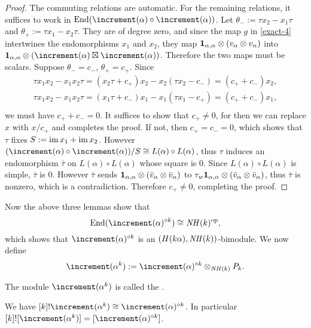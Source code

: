 \begin{proof}
    The commuting relations are automatic. For the remaining relations,
    it suffices to work in $\End(\std(\alpha)\circ\std(\alpha))$.
    Let $\theta_- := \tau x_2-x_1\tau$ and $\theta_+ := \tau x_1-x_2\tau$.
    They are of degree zero, and since the map $g$ 
    in \ref{exact-4} intertwines the endomorphisms
    $x_1$ and $x_2$, they map $\mathbf{1}_{\alpha,\alpha}\otimes(v_\alpha\otimes v_\alpha)$
    into $\1_{\alpha,\alpha}\ox(\std(\alpha)\ex\std(\alpha))$.
    Therefore the two maps must be scalars. Suppose $\theta_- = c_-$,
    $\theta_+ = c_+$. Since 
    \[
    \begin{aligned}
        \tau x_1 x_2-x_1 x_2\tau = (x_2\tau+c_+)x_2-x_2(\tau x_2-c_-)
         = (c_++c_-)x_2,\\
        \tau x_1 x_2-x_1 x_2\tau = (x_1\tau+c_-)x_1-x_1(\tau x_1-c_+)
         = (c_++c_-)x_1,\\
    \end{aligned}
    \]
    we must have $c_++c_- = 0$. It suffices to show that 
    $c_+\ne 0$, for then we can replace $x$ with $x/c_+$ and completes 
    the proof. If not, then $c_+ = c_- = 0$, which shows that $\tau$
    fixes $S := \operatorname{im} x_1+\operatorname{im} x_2$. However $(\std(\alpha)\circ\std(\alpha))
    /S\cong L(\alpha)\circ L(\alpha)$, thus $\tau$ induces an
    endomorphism $\bar\tau$ on $L(\alpha)\circ L(\alpha)$ whose square is $0$.
    Since $L(\alpha)\circ L(\alpha)$ is simple, $\bar\tau$ is $0$.
    However $\bar\tau$ sends $\mathbf{1}_{\alpha,\alpha}\otimes(\bar{v}_\alpha
    \otimes\bar{v}_\alpha)$ to $\tau_w\mathbf{1}_{\alpha,\alpha}\otimes(\bar{v}_\alpha
    \otimes\bar{v}_\alpha)$, thus $\bar\tau$ is nonzero, which is a contradiction.
    Therefore $c_+\ne 0$, completing the proof.
\end{proof}

Now the above three lemmas show that $$\End(\std(\alpha)^{\circ k})
\cong\NH(k)^{\mathrm{op}},$$ which shows that $\std(\alpha)^{\circ k}$
is an $(H(k\alpha),\mathit{NH}(k))$-bimodule. We now define $$\std(\alpha^k)
 := \std(\alpha)^{\circ k}\ox_{\NH(k)}P_k.$$

\begin{definition}
    The module $\std(\alpha^k)$ is called the .
\end{definition}

\begin{proposition}\label{divided-power}
    We have $[k]!\std(\alpha^k)\cong\std(\alpha)^{\circ k}$.
    In particular $[k]![\std(\alpha^k)] = [\std(\alpha)^{\circ k}]$.
\end{proposition}

